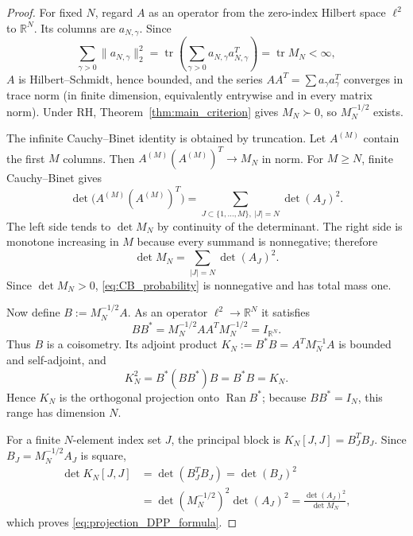 \documentclass[11pt]{amsart}
\numberwithin{equation}{section}
\theoremstyle{plain}
\theoremstyle{definition}
\theoremstyle{remark}
\newcommand{\RH}{\mathrm{RH}}
\begin{document}
\begin{proof}
For fixed $N$, regard $A$ as an operator from the zero-index Hilbert space $\ell^2$ to $\mathbb R^N$.  Its columns are $a_{N,\gamma}$.  Since
\begin{equation}
\sum_{\gamma>0}\|a_{N,\gamma}\|_2^2
=\operatorname{tr}\left(\sum_{\gamma>0}a_{N,\gamma}a_{N,\gamma}^T\right)
=\operatorname{tr}M_N<\infty,
\end{equation}
$A$ is Hilbert--Schmidt, hence bounded, and the series $AA^T=\sum a_\gamma a_\gamma^T$ converges in trace norm (in finite dimension, equivalently entrywise and in every matrix norm).  Under $\RH$, Theorem~\ref{thm:main_criterion} gives $M_N\succ0$, so $M_N^{-1/2}$ exists.

The infinite Cauchy--Binet identity is obtained by truncation.  Let $A^{(M)}$ contain the first $M$ columns.  Then
$A^{(M)}(A^{(M)})^T\to M_N$ in norm.  For $M\ge N$, finite Cauchy--Binet gives
\begin{equation}
\det\bigl(A^{(M)}(A^{(M)})^T\bigr)
=\sum_{J\subset\{1,\ldots,M\},\ |J|=N}\det(A_J)^2.
\end{equation}
The left side tends to $\det M_N$ by continuity of the determinant.  The right side is monotone increasing in $M$ because every summand is nonnegative; therefore
\begin{equation}
\det M_N=\sum_{|J|=N}\det(A_J)^2.
\label{eq:CB_normalization_again}
\end{equation}
Since $\det M_N>0$, \eqref{eq:CB_probability} is nonnegative and has total mass one.

Now define $B:=M_N^{-1/2}A$.  As an operator $\ell^2\to\mathbb R^N$ it satisfies
\begin{equation}
BB^*=M_N^{-1/2}AA^TM_N^{-1/2}=I_{\mathbb R^N}.
\end{equation}
Thus $B$ is a coisometry.  Its adjoint product
$K_N:=B^*B=A^TM_N^{-1}A$ is bounded and self-adjoint, and
\begin{equation}
K_N^2=B^*(BB^*)B=B^*B=K_N.
\end{equation}
Hence $K_N$ is the orthogonal projection onto $\operatorname{Ran}B^*$; because $BB^*=I_N$, this range has dimension $N$.

For a finite $N$-element index set $J$, the principal block is
$K_N[J,J]=B_J^TB_J$.  Since $B_J=M_N^{-1/2}A_J$ is square,
\begin{align}
\det K_N[J,J]
&=\det(B_J^TB_J)=\det(B_J)^2\\
&=\det(M_N^{-1/2})^2\det(A_J)^2
=\frac{\det(A_J)^2}{\det M_N},
\end{align}
which proves \eqref{eq:projection_DPP_formula}.
\end{proof}
\end{document}
